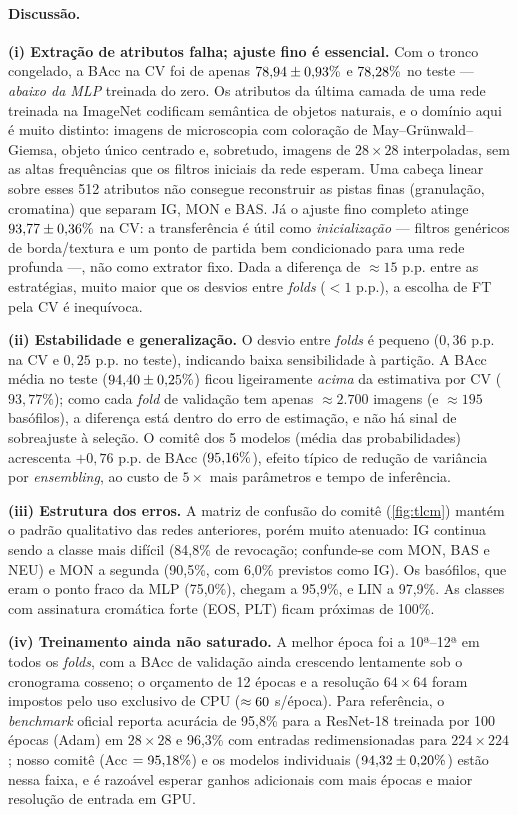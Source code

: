 \paragraph{Discussão.}
\textbf{(i) Extração de atributos falha; ajuste fino é essencial.} Com o tronco congelado, a BAcc na CV foi
de apenas $78{,}94 \pm 0{,}93\%$ e $78{,}28\%$ no teste --- \emph{abaixo da MLP} treinada do zero. Os atributos da última
camada de uma rede treinada na ImageNet codificam semântica de objetos naturais, e o domínio aqui é muito
distinto: imagens de microscopia com coloração de May--Grünwald--Giemsa, objeto único centrado e,
sobretudo, imagens de $28\times28$ interpoladas, sem as altas frequências que os filtros iniciais da rede esperam.
Uma cabeça linear sobre esses 512 atributos não consegue reconstruir as pistas finas (granulação, cromatina)
que separam IG, MON e BAS. Já o ajuste fino completo atinge $93{,}77 \pm 0{,}36\%$ na CV: a transferência é útil
como \emph{inicialização} --- filtros genéricos de borda/textura e um ponto de partida bem condicionado para
uma rede profunda ---, não como extrator fixo. Dada a diferença de $\approx15$ p.p. entre as estratégias,
muito maior que os desvios entre \emph{folds} ($<1$ p.p.), a escolha de FT pela CV é inequívoca.

\textbf{(ii) Estabilidade e generalização.} O desvio entre \emph{folds} é pequeno ($0{,}36$ p.p. na CV e
$0{,}25$ p.p. no teste), indicando baixa sensibilidade à partição. A BAcc média no teste
($94{,}40 \pm 0{,}25\%$) ficou ligeiramente \emph{acima} da estimativa por CV ($93{,}77\%$); como cada
\emph{fold} de validação tem apenas $\approx2.700$ imagens (e $\approx195$ basófilos), a diferença está dentro
do erro de estimação, e não há sinal de sobreajuste à seleção. O comitê dos 5 modelos (média das
probabilidades) acrescenta $+0{,}76$ p.p. de BAcc ($95{,}16\%$), efeito típico de redução de variância por
\emph{ensembling}, ao custo de $5\times$ mais parâmetros e tempo de inferência.

\textbf{(iii) Estrutura dos erros.} A matriz de confusão do comitê (\cref{fig:tlcm}) mantém
o padrão qualitativo das redes anteriores, porém muito atenuado: IG continua sendo a classe mais difícil
(84,8\% de revocação; confunde-se com MON, BAS e NEU) e MON a segunda (90,5\%, com 6,0\% previstos como IG).
Os basófilos, que eram o ponto fraco da MLP (75,0\%), chegam a 95,9\%, e LIN a 97,9\%. As classes com
assinatura cromática forte (EOS, PLT) ficam próximas de 100\%.

\textbf{(iv) Treinamento ainda não saturado.} A melhor época foi a 10ª--12ª em todos os \emph{folds}, com a
BAcc de validação ainda crescendo lentamente sob o cronograma cosseno; o orçamento de 12 épocas e a resolução
$64\times64$ foram impostos pelo uso exclusivo de CPU ($\approx60$ s/época). Para referência, o
\emph{benchmark} oficial \cite{yang2021} reporta acurácia de 95,8\% para a ResNet-18 treinada
por 100 épocas (Adam) em $28\times28$ e 96,3\% com entradas redimensionadas para $224\times224$; nosso comitê
(Acc $=95{,}18\%$) e os modelos individuais ($94{,}32 \pm 0{,}20\%$) estão nessa faixa, e é razoável esperar
ganhos adicionais com mais épocas e maior resolução de entrada em GPU.
